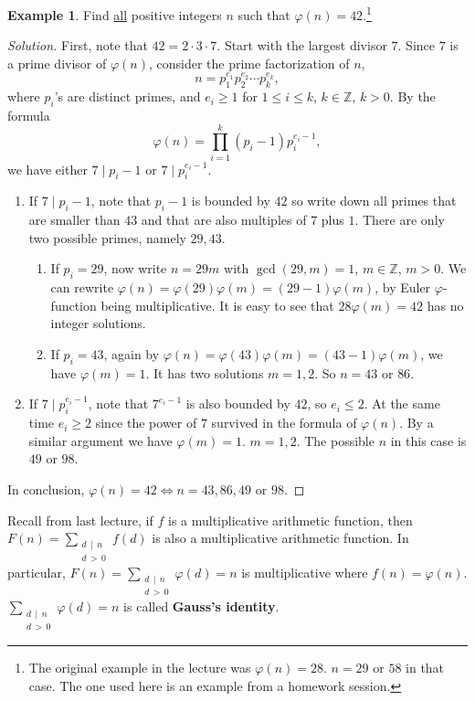 \documentclass{amsbook}
\theoremstyle{plain}
\theoremstyle{definition}
\newtheorem{example}[theorem]{Example}
\theoremstyle{remark}
\numberwithin{equation}{chapter}
\numberwithin{figure}{chapter}
\newcommand{\Z}{\mathbb{Z}}
\begin{document}
\begin{example}
  Find \underline{all} positive integers $n$ such that $\varphi (n) = 42$.\footnote{The original example in the lecture was $\varphi (n) = 28$. $n = 29 \text{ or } 58$ in that case. The one used here is an example from a homework session.}
\end{example}
\begin{proof}[Solution]
First, note that $42 = 2 \cdot 3 \cdot 7$. Start with the largest divisor $7$. Since $7$ is a prime divisor of $\varphi (n)$, consider the prime factorization of $n$,
\[
 n = p_1^{e_1}p_2^{e_2} \cdots p_k^{e_k},
\]
where $p_i$'s are distinct primes, and $e_i \geqslant 1$ for $1 \leqslant i \leqslant k$, $k \in \Z$, $k > 0$. By the formula
\[
\varphi (n) = \prod_{i=1}^k (p_i - 1) p_i^{e_i -1},
\]
 we have either $7 \mid p_i -1$ or $7 \mid p_i^{e_i -1}$.
\begin{enumerate}[label=(\roman*)]
\item If $7 \mid p_i -1$, note that $p_i - 1$ is bounded by $42$ so write down all primes that are smaller than $43$ and that are also multiples of $7$ plus $1$. There are only two possible primes, namely $29, 43$.
\begin{enumerate}
\item If $ p_i = 29 $, now write $n = 29m$ with $\gcd (29,m) = 1$, $m \in \Z$, $m > 0$. We can rewrite $\varphi(n) = \varphi(29)\varphi(m) = (29 - 1) \varphi(m)$, by Euler $\varphi$-function being multiplicative. It is easy to see that $28 \varphi(m) = 42$ has no integer solutions.
\item If $p_i = 43$, again by $\varphi(n) = \varphi(43) \varphi(m) = (43 - 1) \varphi (m)$, we have $\varphi(m) = 1$. It has two solutions $m = 1, 2$. So $n = 43$ or $86$.
\end{enumerate}
\item If $7 \mid p_i^{e_i -1}$, note that $7^{e_i -1 }$ is also bounded by $42$, so $e_i \leqslant 2$. At the same time $e_i \geqslant 2$ since the power of $7$ survived in the formula of $\varphi(n)$. By a similar argument we have $\varphi(m) = 1$. $m = 1, 2$. The possible $n$ in this case is $49$ or $98$.
\end{enumerate}          
 In conclusion, $\varphi(n) = 42 \iff n = 43, 86, 49 \text{ or } 98$.  
\end{proof}

Recall from last lecture, if $f$ is a multiplicative arithmetic function, then $F(n) = \sum_{\substack{d\, \mid \, n \\ d \, > \, 0}} f(d)$ is also a multiplicative arithmetic function. In particular, $F(n) = \sum_{\substack{d\, \mid \, n \\ d \, > \, 0}} \varphi (d) = n$ is multiplicative where $f(n) = \varphi (n)$. $\sum_{\substack{d\, \mid \, n \\ d \, > \, 0}} \varphi (d) = n$ is called \textbf{Gauss's identity}.
\end{document}
